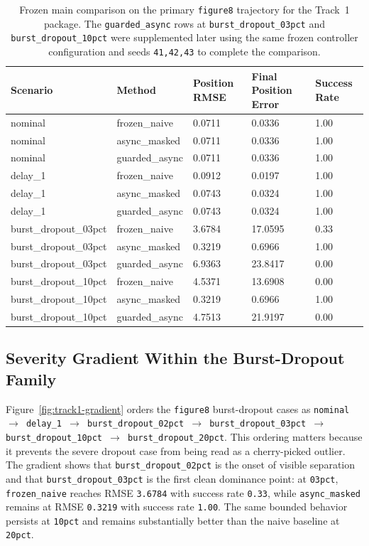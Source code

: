 \documentclass[12pt,a4paper]{article}
\begin{document}
\begin{table}[t]
  \centering
  \caption{Frozen main comparison on the primary \texttt{figure8} trajectory for the Track~1 package. The \texttt{guarded\_async} rows at \texttt{burst\_dropout\_03pct} and \texttt{burst\_dropout\_10pct} were supplemented later using the same frozen controller configuration and seeds \texttt{41,42,43} to complete the comparison.}
  \label{tab:track1-main-table}
  \small
  \begin{tabular}{lllll}
    \toprule
    Scenario & Method & Position RMSE & Final Position Error & Success Rate \\
    \midrule
    nominal & frozen\_naive & 0.0711 & 0.0336 & 1.00 \\
    nominal & async\_masked & 0.0711 & 0.0336 & 1.00 \\
    nominal & guarded\_async & 0.0711 & 0.0336 & 1.00 \\
    delay\_1 & frozen\_naive & 0.0912 & 0.0197 & 1.00 \\
    delay\_1 & async\_masked & 0.0743 & 0.0324 & 1.00 \\
    delay\_1 & guarded\_async & 0.0743 & 0.0324 & 1.00 \\
    burst\_dropout\_03pct & frozen\_naive & 3.6784 & 17.0595 & 0.33 \\
    burst\_dropout\_03pct & async\_masked & 0.3219 & 0.6966 & 1.00 \\
    burst\_dropout\_03pct & guarded\_async & 6.9363 & 23.8417 & 0.00 \\
    burst\_dropout\_10pct & frozen\_naive & 4.5371 & 13.6908 & 0.00 \\
    burst\_dropout\_10pct & async\_masked & 0.3219 & 0.6966 & 1.00 \\
    burst\_dropout\_10pct & guarded\_async & 4.7513 & 21.9197 & 0.00 \\
    \bottomrule
  \end{tabular}
\end{table}

\subsection{Severity Gradient Within the Burst-Dropout Family}

Figure~\ref{fig:track1-gradient} orders the \texttt{figure8} burst-dropout cases as \texttt{nominal $\rightarrow$ delay\_1 $\rightarrow$ burst\_dropout\_02pct $\rightarrow$ burst\_dropout\_03pct $\rightarrow$ burst\_dropout\_10pct $\rightarrow$ burst\_dropout\_20pct}. This ordering matters because it prevents the severe dropout case from being read as a cherry-picked outlier. The gradient shows that \texttt{burst\_dropout\_02pct} is the onset of visible separation and that \texttt{burst\_dropout\_03pct} is the first clean dominance point: at \texttt{03pct}, \texttt{frozen\_naive} reaches RMSE \texttt{3.6784} with success rate \texttt{0.33}, while \texttt{async\_masked} remains at RMSE \texttt{0.3219} with success rate \texttt{1.00}. The same bounded behavior persists at \texttt{10pct} and remains substantially better than the naive baseline at \texttt{20pct}.
\end{document}

